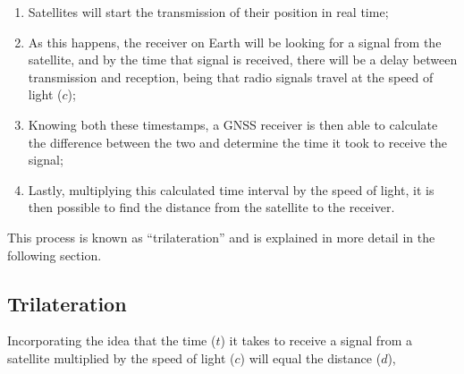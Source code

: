\begin{enumerate}
    \item Satellites will start the transmission of their position in real time;
    \item As this happens, the receiver on Earth will be looking for a signal from the satellite, and by the time that signal is received, there will be a delay between transmission and reception, being that radio signals travel at the speed of light ($c$);
    \item Knowing both these timestamps, a GNSS receiver is then able to calculate the difference between the two and determine the time it took to receive the signal;
    \item Lastly, multiplying this calculated time interval by the speed of light, it is then possible to find the distance from the satellite to the receiver.
\end{enumerate}
This process is known as ``trilateration'' and is explained in more detail in the following section.

\subsection{Trilateration}\label{sec:II_gnss_trilateration}

Incorporating the idea that the time ($t$) it takes to receive a signal from a satellite multiplied by the speed of light ($c$) will equal the distance ($d$),

